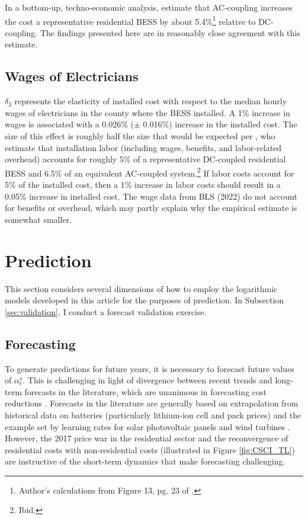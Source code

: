 \documentclass[preprint,12pt,authoryear]{elsarticle}
\begin{document}
In a bottom-up, techno-economic analysis, \citet{ramasamy2021} estimate that AC-coupling increases the cost a representative residential BESS by about 5.4\%\footnote{Author's calculations from Figure 13, pg. 23 of \citet{ramasamy2021}.} relative to DC-coupling. The findings presented here are in reasonably close agreement with this estimate.

\subsection{Wages of Electricians}\label{sec:wages}

$\delta_3$ represents the elasticity of installed cost with respect to the median hourly wages of electricians in the county where the BESS installed. A 1\% increase in wages is associated with a 0.026\% ($\pm$ 0.016\%) increase in the installed cost. The size of this effect is roughly half the size that would be expected per \citet{ramasamy2021}, who estimate that installation labor (including wages, benefits, and labor-related overhead) accounts for roughly 5\% of a representative DC-coupled residential BESS and 6.5\% of an equivalent AC-coupled system.\footnote{Ibid.} If labor costs account for 5\% of the installed cost, then a 1\% increase in labor costs should result in a 0.05\% increase in installed cost. The wage data from BLS (2022) do not account for benefits or overhead, which may partly explain why the empirical estimate is somewhat smaller.

\section{Prediction}\label{sec:prediction}

This section considers several dimensions of how to employ the logarithmic models developed in this article for the purposes of prediction. In Subsection \ref{sec:validation}, I conduct a forecast validation exercise.

\subsection{Forecasting}\label{sec:forecasting}

To generate predictions for future years, it is necessary to forecast future values of $\alpha^s_t$. This is challenging in light of divergence between recent trends and long-term forecasts in the literature, which are unanimous in forecasting cost reductions \citep{schmidt2019,mongird2020,augustineblair2021,viswanathan2022}. Forecasts in the literature are generally based on extrapolation from historical data on batteries (particularly lithium-ion cell and pack prices) and the example set by learning rates for solar photovoltaic panels and wind turbines \citep{kittner2017}. However, the 2017 price war in the residential sector and the reconvergence of residential costs with non-residential costs (illustrated in Figure \ref{fig:CSCI_TL}) are instructive of the short-term dynamics that make forecasting challenging. 
\end{document}
